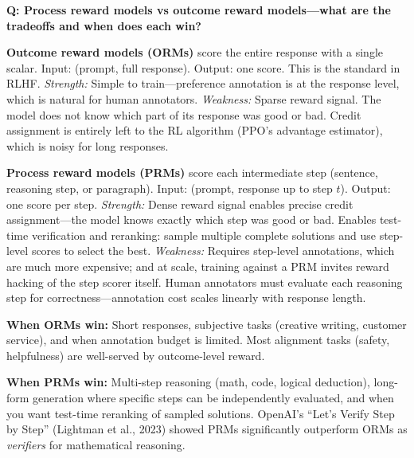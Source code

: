\begin{interviewq}
\textbf{Q: Process reward models vs outcome reward models---what are the tradeoffs and when does each win?}

 \quad {} \quad \badgefreq{\freqmed}

\stronganswer

\textbf{Outcome reward models (ORMs)} score the entire response with a single scalar. Input: (prompt, full response). Output: one score. This is the standard in RLHF. \textit{Strength:} Simple to train---preference annotation is at the response level, which is natural for human annotators. \textit{Weakness:} Sparse reward signal. The model does not know which part of its response was good or bad. Credit assignment is entirely left to the RL algorithm (PPO's advantage estimator), which is noisy for long responses.

\textbf{Process reward models (PRMs)} score each intermediate step (sentence, reasoning step, or paragraph). Input: (prompt, response up to step $t$). Output: one score per step. \textit{Strength:} Dense reward signal enables precise credit assignment---the model knows exactly which step was good or bad. Enables test-time verification and reranking: sample multiple complete solutions and use step-level scores to select the best. \textit{Weakness:} Requires step-level annotations, which are much more expensive; and at scale, training against a PRM invites reward hacking of the step scorer itself. Human annotators must evaluate each reasoning step for correctness---annotation cost scales linearly with response length.

\textbf{When ORMs win:} Short responses, subjective tasks (creative writing, customer service), and when annotation budget is limited. Most alignment tasks (safety, helpfulness) are well-served by outcome-level reward.

\textbf{When PRMs win:} Multi-step reasoning (math, code, logical deduction), long-form generation where specific steps can be independently evaluated, and when you want test-time reranking of sampled solutions. OpenAI's ``Let's Verify Step by Step'' (Lightman et al., 2023) showed PRMs significantly outperform ORMs as \textit{verifiers} for mathematical reasoning.


\end{interviewq}
